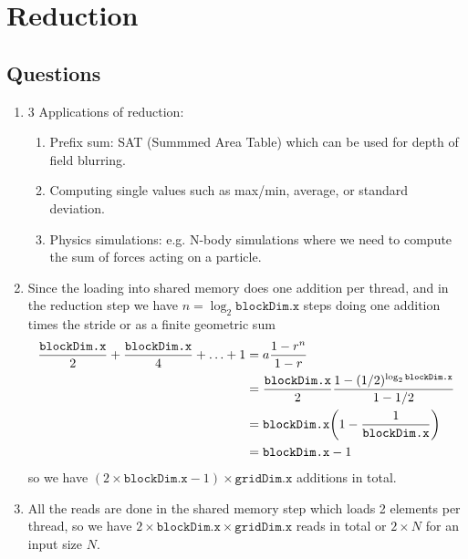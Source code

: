 \documentclass[../main.tex]{subfiles}
\begin{document}
\pagestyle{fancy}


\renewcommand{\thefigure}{\arabic{figure}}
\section*{Reduction}

\subsection*{Questions}

\begin{enumerate}
    \item 3 Applications of reduction:
    \begin{enumerate}
        \item Prefix sum: SAT (Summmed Area Table) which can be used for depth of field blurring.
        \item Computing single values such as max/min, average, or standard deviation.
        \item Physics simulations: e.g. N-body simulations where we need to compute the sum of
        forces acting on a particle.
    \end{enumerate}
    
    \item Since the loading into shared memory does one addition per thread, and in the reduction
    step we have $n = \log_2{\texttt{blockDim.x}}$ steps doing one addition times the stride or as a
    finite geometric sum
    \begin{align*}
        \frac{\texttt{blockDim.x}}{2} + \frac{\texttt{blockDim.x}}{4} + \ldots + 1
        &= a \frac{1 - r^{n}}{1 - r} \\
        &= \frac{\texttt{blockDim.x}}{2} \frac{1 - (1/2)^{\log_2{\texttt{blockDim.x}}}}{1 - 1/2} \\
        &= \texttt{blockDim.x} \qt(1 - \frac{1}{\texttt{blockDim.x}}) \\
        &= \texttt{blockDim.x} - 1
    \end{align*}
    so we have $(2 \times \texttt{blockDim.x} - 1) \times \texttt{gridDim.x}$ additions in total.

    \item All the reads are done in the shared memory step which loads 2 elements per thread, so
    we have $2 \times \texttt{blockDim.x} \times \texttt{gridDim.x}$ reads in total or $2 \times N$
    for an input size $N$.


\end{enumerate}
\end{document}
